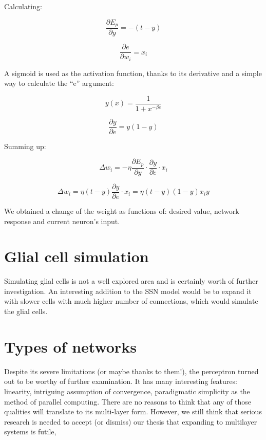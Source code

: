 \documentclass[10pt,oneside]{memoir}
\begin{document}
Calculating:


\begin{equation}
\frac{\partial {E}_{p}}{\partial y}=-(t-y)
\end{equation}


\begin{equation}
\frac{\partial e}{\partial {w}_{i}}={x}_{i}
\end{equation}


A sigmoid is used as the activation function, thanks to its derivative and a simple way to calculate the ``e'' argument:


\begin{equation}
y\left(x\right)=\frac{1}{1+{x}^{-\beta e}}
\end{equation}


\begin{equation}
\frac{\partial y}{\partial e}=y(1-y)
\end{equation}


Summing up:


\begin{equation}
\Delta {w}_{i}=-\eta \frac{\partial {E}_{p}}{\partial y}\cdot \frac{\partial y}{\partial e}\cdot {x}_{i}
\end{equation}


\begin{equation}
\Delta {w}_{i}=\eta (t-y)\frac{\partial y}{\partial e}\cdot {x}_{i}=\eta (t-y)(1-y){x}_{i}y
\end{equation}


We obtained a change of the weight as functions of: desired value, network response and current neuron's input.


\chapter{Glial cell simulation}
\label{glialcellsimulation}

Simulating glial cells is not a well explored area and is certainly worth of further investigation. An interesting addition to the SSN model would be to expand it with slower cells with much higher number of connections, which would simulate the glial cells.


\chapter{Types of networks}
\label{typesofnetworks}

Despite its severe limitations (or maybe thanks to them!), the perceptron turned out to be worthy of further examination. It has many interesting features: linearity, intriguing assumption of convergence, paradigmatic simplicity as the method of parallel computing. There are no reasons to think that any of those qualities will translate to its multi-layer form. However, we still think that serious research is needed to accept (or dismiss) our thesis that expanding to multilayer systems is futile, ~\cite{Minsky:Papert:1969}
\end{document}
